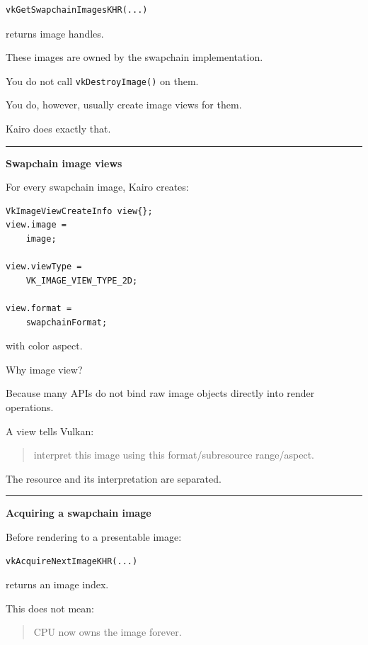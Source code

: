 \begin{verbatim}
vkGetSwapchainImagesKHR(...)
\end{verbatim}

returns image handles.

These images are owned by the swapchain implementation.

You do not call \texttt{vkDestroyImage()} on them.

You do, however, usually create image views for them.

Kairo does exactly that.

\begin{center}\rule{0.5\linewidth}{0.5pt}\end{center}

\textbf{Swapchain image views}

For every swapchain image, Kairo creates:

\begin{verbatim}
VkImageViewCreateInfo view{};
view.image =
    image;

view.viewType =
    VK_IMAGE_VIEW_TYPE_2D;

view.format =
    swapchainFormat;
\end{verbatim}

with color aspect.

Why image view?

Because many APIs do not bind raw image objects directly into render operations.

A view tells Vulkan:

\begin{quote}
interpret this image using this format/subresource range/aspect.
\end{quote}

The resource and its interpretation are separated.

\begin{center}\rule{0.5\linewidth}{0.5pt}\end{center}

\textbf{Acquiring a swapchain image}

Before rendering to a presentable image:

\begin{verbatim}
vkAcquireNextImageKHR(...)
\end{verbatim}

returns an image index.

This does not mean:

\begin{quote}
CPU now owns the image forever.
\end{quote}

